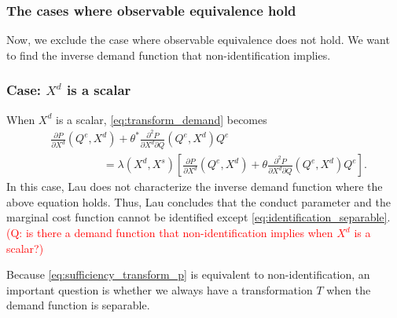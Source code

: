\documentclass[11pt, a4paper]{article}
\theoremstyle{remark}
\begin{document}
\subsubsection{The cases where observable equivalence hold}
Now, we exclude the case where observable equivalence does not hold.
We want to find the inverse demand function that non-identification implies.

\subsubsection*{Case: $X^{d}$ is a scalar}
When $X^{d}$ is a scalar,  \eqref{eq:transform_demand} becomes
\begin{align}
    &\frac{\partial P}{\partial X^{d}}(Q^e, X^{d}) + \theta^{*}\frac{\partial^2 P}{\partial X^{d}\partial Q}(Q^e, X^{d})Q^e \\
    &\hspace{2cm} = \lambda(X^{d}, X^{s})\left[\frac{\partial P}{\partial X^{d}} (Q^e, X^{d})+ \theta \frac{\partial^2 P}{\partial X^{d}\partial Q}(Q^e, X^{d})Q^e\right].
\end{align}
In this case, Lau does not characterize the inverse demand function where the above equation holds.
Thus, Lau concludes that the conduct parameter and the marginal cost function cannot be identified except \eqref{eq:identification_separable}.
\textcolor{red}{(Q: is there a demand function that non-identification implies when $X^{d}$ is a scalar?)}






























Because \eqref{eq:sufficiency_transform_p} is equivalent to non-identification, an important question is whether we always have a transformation $T$  when the demand function is separable.
\end{document}
